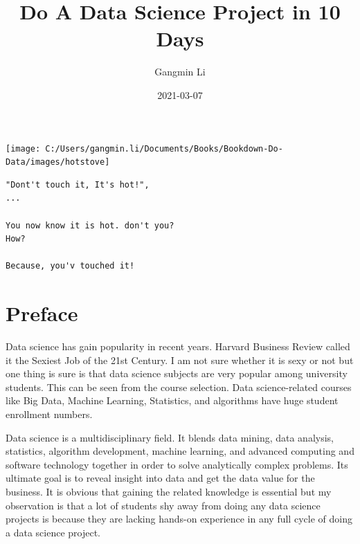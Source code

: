 \documentclass[
]{book}
\title{Do A Data Science Project in 10 Days}
\author{Gangmin Li}
\date{2021-03-07}
\begin{document}
\maketitle

\thispagestyle{empty}
\begin{center}

\end{center}

\setlength{\abovedisplayskip}{-5pt}
\setlength{\abovedisplayshortskip}{-5pt}

{
\setcounter{tocdepth}{2}
\tableofcontents
}
\hypertarget{section}{%
\chapter*{}\label{section}}

\begin{center}\texttt{[image: C:/Users/gangmin.li/Documents/Books/Bookdown-Do-Data/images/hotstove]} \end{center}

\begin{verbatim}
"Dont't touch it, It's hot!",
...

You now know it is hot. don't you?
How?

Because, you'v touched it!
\end{verbatim}

\hypertarget{preface}{%
\chapter*{Preface}\label{preface}}


Data science has gain popularity in recent years. Harvard Business Review called it the Sexiest Job of the 21st Century. I am not sure whether it is sexy or not but one thing is sure is that data science subjects are very popular among university students. This can be seen from the course selection. Data science-related courses like Big Data, Machine Learning, Statistics, and algorithms have huge student enrollment numbers.

Data science is a multidisciplinary field. It blends data mining, data analysis, statistics, algorithm development, machine learning, and advanced computing and software technology together in order to solve analytically complex problems. Its ultimate goal is to reveal insight into data and get the data value for the business. It is obvious that gaining the related knowledge is essential but my observation is that a lot of students shy away from doing any data science projects is because they are lacking hands-on experience in any full cycle of doing a data science project.
\end{document}

